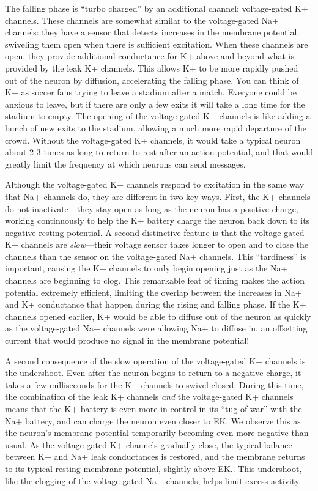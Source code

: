 \documentclass[
]{book}
\begin{document}
The falling phase is ``turbo charged'' by an additional channel: voltage-gated K+ channels. These channels are somewhat similar to the voltage-gated Na+ channels: they have a sensor that detects increases in the membrane potential, swiveling them open when there is sufficient excitation. When these channels are open, they provide additional conductance for K+ above and beyond what is provided by the leak K+ channels. This allows K+ to be more rapidly pushed out of the neuron by diffusion, accelerating the falling phase. You can think of K+ as soccer fans trying to leave a stadium after a match. Everyone could be anxious to leave, but if there are only a few exits it will take a long time for the stadium to empty. The opening of the voltage-gated K+ channels is like adding a bunch of new exits to the stadium, allowing a much more rapid departure of the crowd. Without the voltage-gated K+ channels, it would take a typical neuron about 2-3 times as long to return to rest after an action potential, and that would greatly limit the frequency at which neurons can send messages.

Although the voltage-gated K+ channels respond to excitation in the same way that Na+ channels do, they are different in two key ways. First, the K+ channels do not inactivate---they stay open as long as the neuron has a positive charge, working continuously to help the K+ battery charge the neuron back down to its negative resting potential. A second distinctive feature is that the voltage-gated K+ channels are \emph{slow}---their voltage sensor takes longer to open and to close the channels than the sensor on the voltage-gated Na+ channels. This ``tardiness'' is important, causing the K+ channels to only begin opening just as the Na+ channels are beginning to clog. This remarkable feat of timing makes the action potential extremely efficient, limiting the overlap between the increases in Na+ and K+ conductance that happen during the rising and falling phase. If the K+ channels opened earlier, K+ would be able to diffuse out of the neuron as quickly as the voltage-gated Na+ channels were allowing Na+ to diffuse in, an offsetting current that would produce no signal in the membrane potential!

A second consequence of the slow operation of the voltage-gated K+ channels is the undershoot. Even after the neuron begins to return to a negative charge, it takes a few milliseconds for the K+ channels to swivel closed. During this time, the combination of the leak K+ channels \emph{and} the voltage-gated K+ channels means that the K+ battery is even more in control in its ``tug of war'' with the Na+ battery, and can charge the neuron even closer to EK. We observe this as the neuron's membrane potential temporarily becoming even more negative than usual. As the voltage-gated K+ channels gradually close, the typical balance between K+ and Na+ leak conductances is restored, and the membrane returns to its typical resting membrane potential, slightly above EK.. This undershoot, like the clogging of the voltage-gated Na+ channels, helps limit excess activity.
\end{document}
